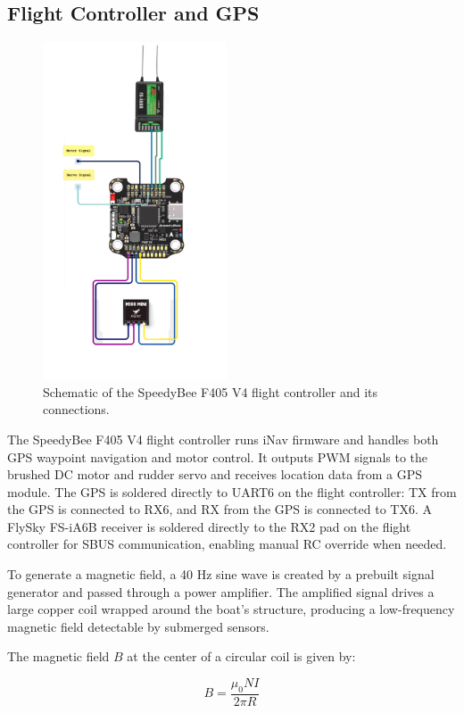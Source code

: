 \subsection{Flight Controller and GPS}
\begin{figure}[H]
    \centering
    \includegraphics[height=10cm]{speedybee.png}
    \caption{Schematic of the SpeedyBee F405 V4 flight controller and its connections.}
    \label{fig:Speedybee}
\end{figure}

The SpeedyBee F405 V4 flight controller runs iNav firmware and handles both GPS waypoint navigation and motor control. It outputs PWM signals to the brushed DC motor and rudder servo and receives location data from a GPS module. The GPS is soldered directly to UART6 on the flight controller: TX from the GPS is connected to RX6, and RX from the GPS is connected to TX6. A FlySky FS-iA6B receiver is soldered directly to the RX2 pad on the flight controller for SBUS communication, enabling manual RC override when needed.

To generate a magnetic field, a 40 Hz sine wave is created by a prebuilt signal generator and passed through a power amplifier. The amplified signal drives a large copper coil wrapped around the boat’s structure, producing a low-frequency magnetic field detectable by submerged sensors.

The magnetic field \( B \) at the center of a circular coil is given by:

\begin{equation}
B = \frac{\mu_0 N I}{2\pi R}
\label{eq:bfield}
\end{equation}

